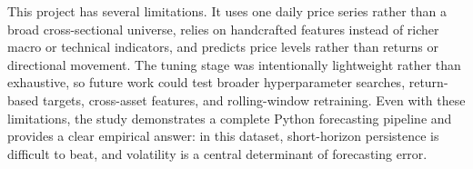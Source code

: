 \documentclass[conference]{IEEEtran}
\begin{document}
This project has several limitations. It uses one daily price series rather than a broad cross-sectional universe, relies on handcrafted features instead of richer macro or technical indicators, and predicts price levels rather than returns or directional movement. The tuning stage was intentionally lightweight rather than exhaustive, so future work could test broader hyperparameter searches, return-based targets, cross-asset features, and rolling-window retraining. Even with these limitations, the study demonstrates a complete Python forecasting pipeline and provides a clear empirical answer: in this dataset, short-horizon persistence is difficult to beat, and volatility is a central determinant of forecasting error.



\end{document}
